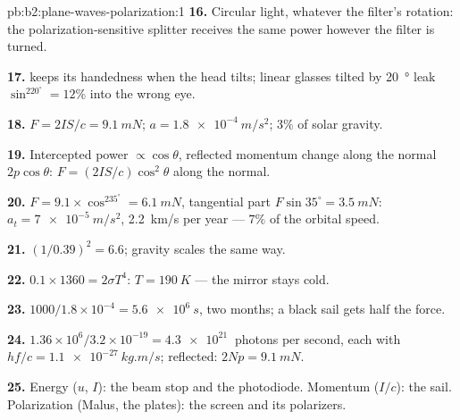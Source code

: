 \begin{solution}{pb:b2:plane-waves-polarization:1}
\textbf{16.} Circular light, whatever the filter's rotation: the
polarization-sensitive splitter receives the same power however the
filter is turned.

\textbf{17.}  keeps its handedness when the head
tilts; linear glasses tilted by \qty{20}{\degree} leak $\sin^220^\circ = 12\%$ into
the wrong eye.

\textbf{18.} $F = 2IS/c = \qty{9.1}{mN}$; $a = \qty{1.8e-4}{m/s^2}$; $3\%$ of solar
gravity.

\textbf{19.} Intercepted power $\propto\cos\theta$, reflected momentum change
along the normal $2p\cos\theta$: $F = (2IS/c)\cos^2\theta$ along the normal.

\textbf{20.} $F = 9.1 \times \cos^235^\circ = \qty{6.1}{mN}$, tangential part $F\sin35^\circ
= \qty{3.5}{mN}$: $a_t = \qty{7e-5}{m/s^2}$, \qty{2.2}{km/s} per year --- $7\%$ of
the orbital speed.

\textbf{21.} $(1/0.39)^2 = 6.6$; gravity scales the same way.

\textbf{22.} $0.1 \times 1360 = 2\sigma T^4$: $T = \qty{190}{K}$ --- the mirror stays
cold.

\textbf{23.} $1000/1.8 \times 10^{-4} = \qty{5.6e6}{s}$, two months; a black sail
gets half the force.

\textbf{24.} $1.36 \times 10^6/3.2 \times 10^{-19} = \qty{4.3e21}{}$ photons per second,
each with $hf/c = \qty{1.1e-27}{kg.m/s}$; reflected: $2Np = \qty{9.1}{mN}$.

\textbf{25.} Energy ($u$, $I$): the beam stop and the photodiode.
Momentum ($I/c$): the sail. Polarization (Malus, the plates): the
screen and its polarizers.
\end{solution}
